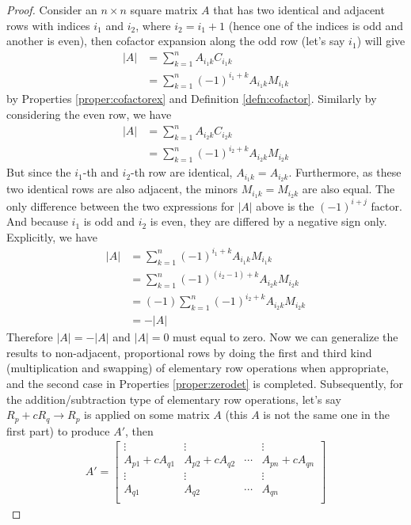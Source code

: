 \begin{proof} Consider an $n \times n$ square matrix $A$ that has two identical and adjacent rows with indices $i_1$ and $i_2$, where $i_2 = i_1 + 1$ (hence one of the indices is odd and another is even), then cofactor expansion along the odd row (let's say $i_1$) will give
\begin{align*}
|A| &= \sum_{k=1}^{n} A_{i_1k}C_{i_1k} \\
&= \sum_{k=1}^{n} (-1)^{i_1+k}A_{i_1k}M_{i_1k}
\end{align*}
by Properties \ref{proper:cofactorex} and Definition \ref{defn:cofactor}. Similarly by considering the even row, we have
\begin{align*}
|A| &= \sum_{k=1}^{n} A_{i_2k}C_{i_2k} \\
&= \sum_{k=1}^{n} (-1)^{i_2+k}A_{i_2k}M_{i_2k}
\end{align*}
But since the $i_1$-th and $i_2$-th row are identical, $A_{i_1k} = A_{i_2k}$. Furthermore, as these two identical rows are also adjacent, the minors $M_{i_1k} = M_{i_2k}$ are also equal. The only difference between the two expressions for $|A|$ above is the $(-1)^{i+j}$ factor. And because $i_1$ is odd and $i_2$ is even, they are differed by a negative sign only. Explicitly, we have
\begin{align*}
|A| &= \sum_{k=1}^{n} (-1)^{i_1+k}A_{i_1k}M_{i_1k} \\
&= \sum_{k=1}^{n} (-1)^{(i_2-1)+k}A_{i_2k}M_{i_2k} \\
&= (-1) \sum_{k=1}^{n} (-1)^{i_2+k}A_{i_2k}M_{i_2k} \\
&= -|A|
\end{align*}
Therefore $|A| = -|A|$ and $|A| = 0$ must equal to zero. Now we can generalize the results to non-adjacent, proportional rows by doing the first and third kind (multiplication and swapping) of elementary row operations when appropriate, and the second case in Properties \ref{proper:zerodet} is completed. Subsequently, for the addition/subtraction type of elementary row operations, let's say $R_{p} + cR_{q} \to R_{p}$ is applied on some matrix $A$ (this $A$ is not the same one in the first part) to produce $A'$, then
\begin{align*}
A' = 
\begin{bmatrix}
\vdots & \vdots & & \vdots\\
A_{p1} + cA_{q1} & A_{p2} + cA_{q2} & \cdots & A_{pn} + cA_{qn} \\
\vdots & \vdots & & \vdots\\
A_{q1} & A_{q2} & \cdots & A_{qn} \\

\end{bmatrix}
\end{align*}
\end{proof}
